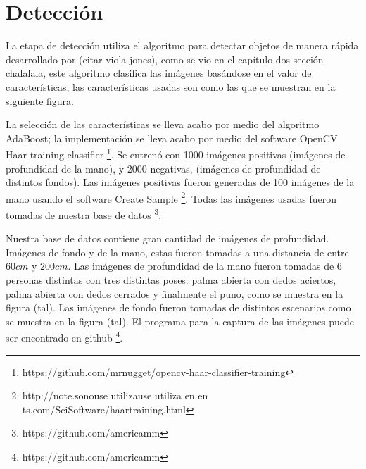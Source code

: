 
\section{Detección}

La etapa de detección utiliza el algoritmo para detectar objetos de manera rápida desarrollado por (citar viola jones), como se vio en el cap\'itulo dos sección chalalala, este algoritmo  clasifica las imágenes basándose en el valor de características, las características usadas son como las que se muestran en la siguiente figura.  

La selección de las características se lleva acabo por medio del algoritmo AdaBoost; la implementaci\'on se lleva acabo por medio del software OpenCV Haar training classifier \footnote{https://github.com/mrnugget/opencv-haar-classifier-training}. Se entren\'o con 1000 imágenes positivas (imágenes de profundidad de la mano), y 2000 negativas, (imágenes de profundidad de distintos fondos). Las imágenes positivas fueron generadas de 100 imágenes de la mano usando el software Create Sample \footnote{http://note.sonouse utilizause utiliza en  en ts.com/SciSoftware/haartraining.html}. Todas las imágenes usadas fueron tomadas de nuestra base de  datos \footnote{https://github.com/americamm}.

Nuestra base de datos contiene gran cantidad de imágenes de profundidad. Imágenes de fondo y de la mano, estas fueron tomadas a una distancia de entre $60 cm$ y $200 cm$. Las imágenes de profundidad de la mano fueron tomadas de 6 personas distintas con tres distintas poses: palma abierta con dedos aciertos, palma abierta con dedos cerrados y finalmente el puno, como se muestra en la figura (tal). Las imágenes de fondo fueron tomadas de distintos escenarios como se muestra en la figura (tal). El programa para la captura de las imágenes puede ser encontrado en github \footnote{https://github.com/americamm}.  






